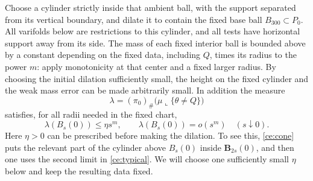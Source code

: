 Choose a cylinder strictly inside that ambient ball, with the support
separated from its vertical boundary, and dilate it to contain the fixed
base ball $B_{300}\subset P_0$.  All varifolds below are restrictions to
this cylinder, and all tests have horizontal support away from its side.
The mass of each fixed interior ball is bounded above by a constant
depending on the fixed data, including $Q$, times its radius to the power $m$: apply monotonicity at that
center and a fixed larger radius.  By choosing the initial dilation
sufficiently small, the height on the fixed cylinder and the weak mass
error can be made arbitrarily small.  In addition the measure
\begin{equation}
 \label{ce:defectmeasure}
 \lambda=(\pi_0)_\#\bigl(\mu\llcorner\{\theta\ne Q\}\bigr)
\end{equation}
satisfies, for all radii needed in the fixed chart,
\begin{equation}
 \label{ce:initialdefect}
 \lambda(B_s(0))\le\eta s^m,
 \qquad \lambda(B_s(0))=o(s^m)\quad(s\downarrow0).
\end{equation}
Here $\eta>0$ can be prescribed before making the dilation.  To see this,
\eqref{ce:cone} puts the relevant part of the cylinder above $B_s(0)$
inside $\mathbf B_{2s}(0)$, and then one uses the second limit in
\eqref{ce:typical}.  We will choose one sufficiently small $\eta$ below
and keep the resulting data fixed.

